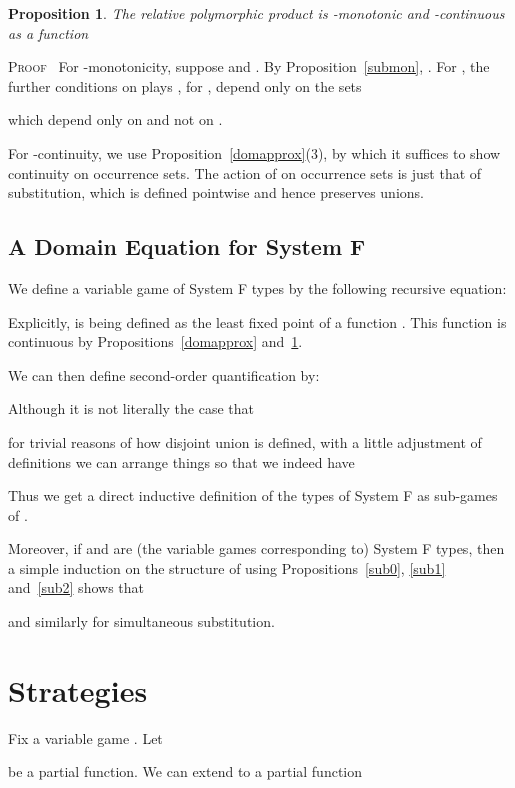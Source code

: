 \documentclass[a4paper,11pt]{article}
\newtheorem{proposition}{Proposition}[section]
\newenvironment{proof}{\textsc{Proof}\ }{}
\begin{document}
\begin{proposition}
\label{prodcont}
The relative polymorphic product  is
-monotonic and -continuous as a function

\end{proposition}
\begin{proof}
For -monotonicity, suppose  and . By Proposition~\ref{submon}, . For , the further conditions on plays , for , depend only on the sets

which depend only on  and not on .

For -continuity, we use Proposition~\ref{domapprox}(3), by
which it suffices to show continuity on occurrence sets. The action of
 on occurrence sets is just that of substitution, which is defined
pointwise and hence preserves unions.
\end{proof}

\subsection{A Domain Equation for System F}

We define a variable game  of System F types by the following
recursive equation:

Explicitly,  is being defined as the least fixed point of a function . This function is continuous by Propositions~\ref{domapprox} and~\ref{prodcont}.

We can then define second-order quantification by:

Although it is not literally the case that

for trivial reasons of how disjoint union is defined, with a
little adjustment of definitions we can arrange things so that we
indeed have

Thus we get a direct inductive definition of the types of System F as
sub-games of .

Moreover, if  and  are (the variable games corresponding to)
System F types, then a simple induction on the structure of  using
Propositions~\ref{sub0}, \ref{sub1} and~\ref{sub2} shows
that

and similarly for simultaneous substitution.



\section{Strategies}


Fix a variable game . Let

be a partial
function. We can extend  to a partial function
\end{document}
